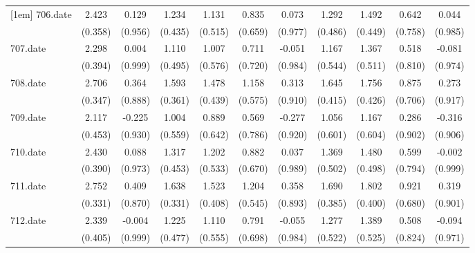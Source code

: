 \begin{tabular}{l*{10}{c}}
[1em]
706.date    &       2.423&       0.129&       1.234&       1.131&       0.835&       0.073&       1.292&       1.492&       0.642&       0.044\\
            &     (0.358)&     (0.956)&     (0.435)&     (0.515)&     (0.659)&     (0.977)&     (0.486)&     (0.449)&     (0.758)&     (0.985)\\
[1em]
707.date    &       2.298&       0.004&       1.110&       1.007&       0.711&      -0.051&       1.167&       1.367&       0.518&      -0.081\\
            &     (0.394)&     (0.999)&     (0.495)&     (0.576)&     (0.720)&     (0.984)&     (0.544)&     (0.511)&     (0.810)&     (0.974)\\
[1em]
708.date    &       2.706&       0.364&       1.593&       1.478&       1.158&       0.313&       1.645&       1.756&       0.875&       0.273\\
            &     (0.347)&     (0.888)&     (0.361)&     (0.439)&     (0.575)&     (0.910)&     (0.415)&     (0.426)&     (0.706)&     (0.917)\\
[1em]
709.date    &       2.117&      -0.225&       1.004&       0.889&       0.569&      -0.277&       1.056&       1.167&       0.286&      -0.316\\
            &     (0.453)&     (0.930)&     (0.559)&     (0.642)&     (0.786)&     (0.920)&     (0.601)&     (0.604)&     (0.902)&     (0.906)\\
[1em]
710.date    &       2.430&       0.088&       1.317&       1.202&       0.882&       0.037&       1.369&       1.480&       0.599&      -0.002\\
            &     (0.390)&     (0.973)&     (0.453)&     (0.533)&     (0.670)&     (0.989)&     (0.502)&     (0.498)&     (0.794)&     (0.999)\\
[1em]
711.date    &       2.752&       0.409&       1.638&       1.523&       1.204&       0.358&       1.690&       1.802&       0.921&       0.319\\
            &     (0.331)&     (0.870)&     (0.331)&     (0.408)&     (0.545)&     (0.893)&     (0.385)&     (0.400)&     (0.680)&     (0.901)\\
[1em]
712.date    &       2.339&      -0.004&       1.225&       1.110&       0.791&      -0.055&       1.277&       1.389&       0.508&      -0.094\\
            &     (0.405)&     (0.999)&     (0.477)&     (0.555)&     (0.698)&     (0.984)&     (0.522)&     (0.525)&     (0.824)&     (0.971)\\

\end{tabular}
